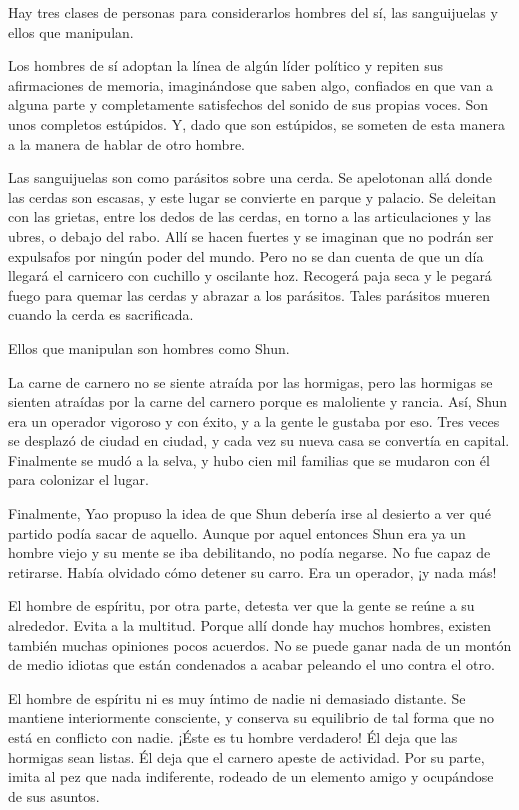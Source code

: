 Hay tres clases de personas para considerarlos hombres del sí, las
sanguijuelas y ellos que manipulan.

Los hombres de sí adoptan la línea de algún líder político y repiten sus
afirmaciones de memoria, imaginándose que saben algo, confiados en que
van a alguna parte y completamente satisfechos del sonido de sus propias
voces. Son unos completos estúpidos. Y, dado que son estúpidos, se
someten de esta manera a la manera de hablar de otro hombre.

Las sanguijuelas son como parásitos sobre una cerda. Se apelotonan allá
donde las cerdas son escasas, y este lugar se convierte en parque y
palacio. Se deleitan con las grietas, entre los dedos de las cerdas, en
torno a las articulaciones y las ubres, o debajo del rabo. Allí se hacen
fuertes y se imaginan que no podrán ser expulsafos por ningún poder del
mundo. Pero no se dan cuenta de que un día llegará el carnicero con
cuchillo y oscilante hoz. Recogerá paja seca y le pegará fuego para
quemar las cerdas y abrazar a los parásitos. Tales parásitos mueren
cuando la cerda es sacrificada.

Ellos que manipulan son hombres como Shun.

La carne de carnero no se siente atraída por las hormigas, pero las
hormigas se sienten atraídas por la carne del carnero porque es
maloliente y rancia. Así, Shun era un operador vigoroso y con éxito, y a
la gente le gustaba por eso. Tres veces se desplazó de ciudad en ciudad,
y cada vez su nueva casa se convertía en capital. Finalmente se mudó a
la selva, y hubo cien mil familias que se mudaron con él para colonizar
el lugar.

Finalmente, Yao propuso la idea de que Shun debería irse al desierto a
ver qué partido podía sacar de aquello. Aunque por aquel entonces Shun
era ya un hombre viejo y su mente se iba debilitando, no podía negarse.
No fue capaz de retirarse. Había olvidado cómo detener su carro. Era un
operador, ¡y nada más!

El hombre de espíritu, por otra parte, detesta ver que la gente se reúne
a su alrededor. Evita a la multitud. Porque allí donde hay muchos
hombres, existen también muchas opiniones pocos acuerdos. No se puede
ganar nada de un montón de medio idiotas que están condenados a acabar
peleando el uno contra el otro.

El hombre de espíritu ni es muy íntimo de nadie ni demasiado distante.
Se mantiene interiormente consciente, y conserva su equilibrio de tal
forma que no está en conflicto con nadie. ¡Éste es tu hombre verdadero!
Él deja que las hormigas sean listas. Él deja que el carnero apeste de
actividad. Por su parte, imita al pez que nada indiferente, rodeado de
un elemento amigo y ocupándose de sus asuntos.


